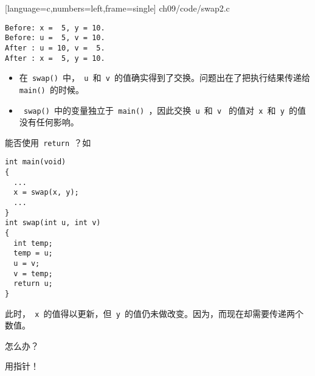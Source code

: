 \begin{frame}\ft{\secname}
  
  [language=c,numbers=left,frame=single]
  {ch09/code/swap2.c}
\end{frame}

\begin{frame}[fragile]\ft{\secname}
\begin{lstlisting}[backgroundcolor=\color{red!10}]
Before: x =  5, y = 10.
Before: u =  5, v = 10.
After : u = 10, v =  5.
After : x =  5, y = 10.
\end{lstlisting}
\pause \vspace{0.1in}

\begin{itemize}
\item
在\lstinline| swap() |中，\lstinline| u |和\lstinline| v |的值确实得到了交换。问题出在了把执行结果传递给\lstinline| main() |的时候。\\[0.1in]
\item
\lstinline| swap() |中的变量独立于\lstinline| main() |，因此交换\lstinline| u |和\lstinline| v | 的值对\lstinline| x |和\lstinline| y |的值没有任何影响。
\end{itemize}

\end{frame}

\begin{frame}[fragile]\ft{\secname}
能否使用\lstinline| return |？如
\begin{lstlisting}[backgroundcolor=\color{red!10}]
int main(void)
{
  ...
  x = swap(x, y);
  ...
}
int swap(int u, int v)
{
  int temp;
  temp = u;
  u = v;
  v = temp;
  return u;
}
\end{lstlisting}
\end{frame}

\begin{frame}[fragile]\ft{\secname}
此时，\lstinline| x |的值得以更新，但\lstinline| y |的值仍未做改变。因为，而现在却需要传递两个数值。
\pause \vspace{0.1in}

\begin{center}
{\Large 怎么办？}
\end{center}
\pause\vspace{0.1in}

\begin{center}
{\Large 用指针！} 
\end{center}
\end{frame}
